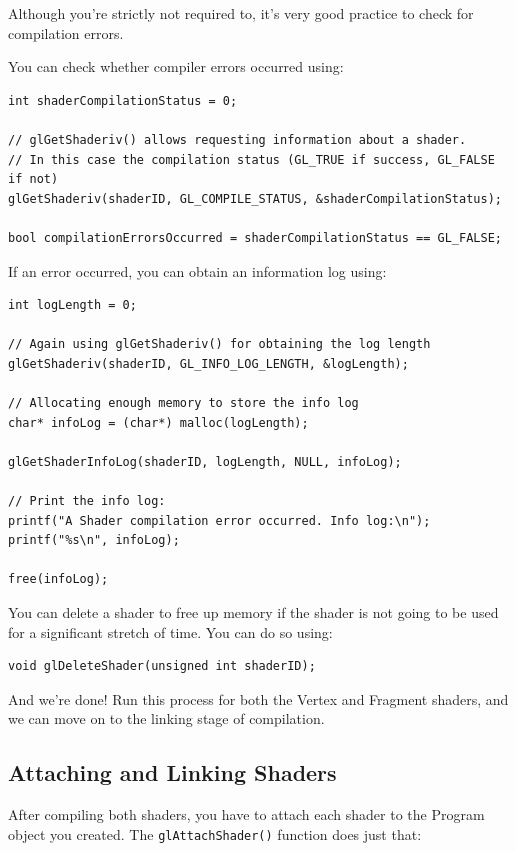 Although you're strictly not required to, it's very good practice to check for compilation errors. 

You can check whether compiler errors occurred using:

\begin{verbatim}
int shaderCompilationStatus = 0;

// glGetShaderiv() allows requesting information about a shader.
// In this case the compilation status (GL_TRUE if success, GL_FALSE if not)
glGetShaderiv(shaderID, GL_COMPILE_STATUS, &shaderCompilationStatus);

bool compilationErrorsOccurred = shaderCompilationStatus == GL_FALSE;
\end{verbatim}

If an error occurred, you can obtain an information log using:

\begin{verbatim}
int logLength = 0;

// Again using glGetShaderiv() for obtaining the log length
glGetShaderiv(shaderID, GL_INFO_LOG_LENGTH, &logLength);

// Allocating enough memory to store the info log
char* infoLog = (char*) malloc(logLength);

glGetShaderInfoLog(shaderID, logLength, NULL, infoLog);

// Print the info log:
printf("A Shader compilation error occurred. Info log:\n");
printf("%s\n", infoLog);

free(infoLog);
\end{verbatim}

You can delete a shader to free up memory if the shader is not going to be used for a significant stretch of time. You can do so using:

\begin{verbatim}
void glDeleteShader(unsigned int shaderID);
\end{verbatim}

And we're done! Run this process for both the Vertex and Fragment shaders, and we can move on to the linking stage of compilation.

\subsection{Attaching and Linking Shaders}

After compiling both shaders, you have to attach each shader to the Program object you created. The \texttt{glAttachShader()} function does just that:


